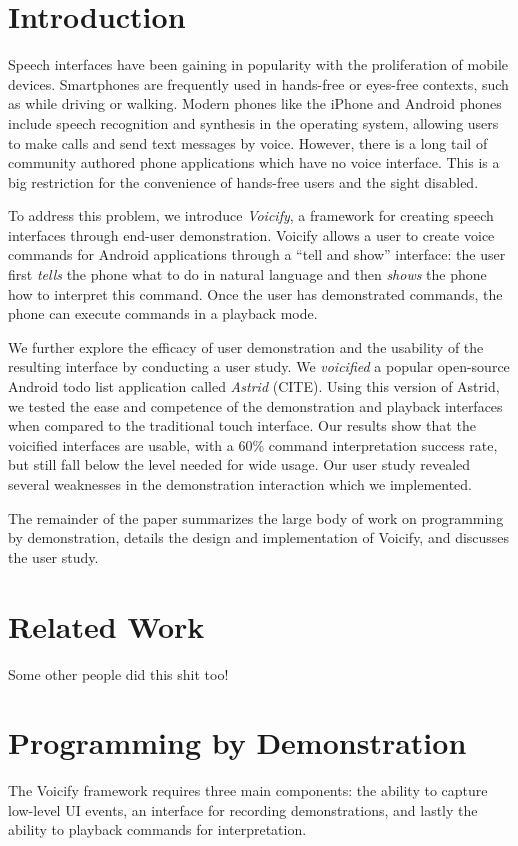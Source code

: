 \documentclass[letterpaper]{article}
\begin{document}
\section{Introduction}
Speech interfaces have been gaining in popularity with the proliferation of mobile devices. Smartphones are
frequently used in hands-free or eyes-free contexts, such as while driving or walking. Modern phones like
the iPhone and Android phones include speech recognition and synthesis in the operating system, allowing
users to make calls and send text messages by voice. However, there is a long tail of community authored
phone applications which have no voice interface. This is a big restriction for the convenience of
hands-free users and the sight disabled. 

To address this problem, we introduce \emph{Voicify}, a framework for creating speech interfaces 
through end-user demonstration. Voicify allows a user to create voice commands for Android
applications through a ``tell and show'' interface: the user first \emph{tells} the phone what 
to do in natural language and then \emph{shows} the phone how to interpret this command.
Once the user has demonstrated commands, the phone can execute commands in a playback mode.

We further explore the efficacy of user demonstration and the usability of the resulting
interface by conducting a user study.  We \emph{voicified} a popular open-source Android todo list
application called \emph{Astrid} (CITE). Using this version of Astrid, we tested the ease and
competence of the demonstration and playback interfaces when compared to the traditional touch
interface. Our results show that the voicified interfaces are usable, with a 60\% command interpretation
success rate, but still fall below the level needed for wide usage. Our user study revealed
several weaknesses in the demonstration interaction which we implemented.

The remainder of the paper summarizes the large body of work on programming by demonstration, details
the design and implementation of Voicify, and discusses the user study.

\section{Related Work}
Some other people did this shit too!

\section{Programming by Demonstration}
The Voicify framework requires three main components: the ability to capture low-level UI events, 
an interface for recording demonstrations, and lastly the ability to playback commands for interpretation.
\end{document}
